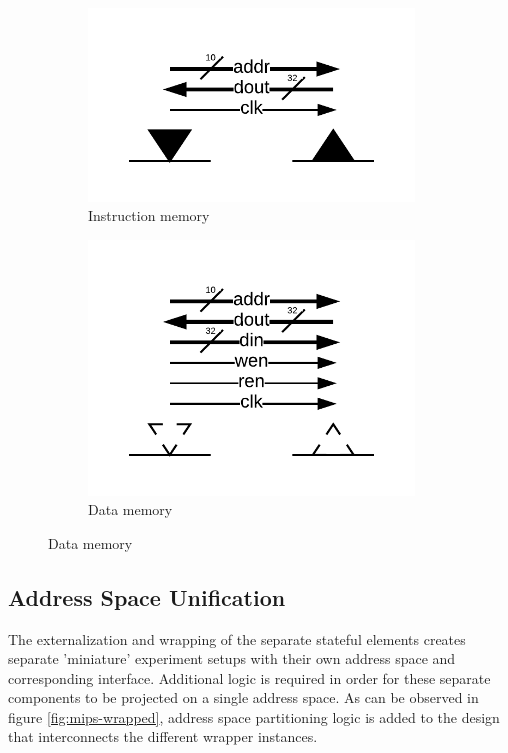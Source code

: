 \documentclass{article}
\begin{document}
\begin{figure}
\begin{subfigure}[b]{0.25\linewidth}
        \centering\captionsetup{width=0.95\linewidth}%
        \includegraphics[width=0.95\textwidth,trim=70px 70px 70px 70px, clip=true]{img/interface-rom}%
        \caption{Instruction memory}
    \end{subfigure}%
    \begin{subfigure}[b]{0.25\linewidth}
        \centering\captionsetup{width=0.95\linewidth}%
        \includegraphics[width=0.95\textwidth,trim=70px 70px 70px 70px, clip=true]{img/interface-ram}%
        \caption{Data memory}
    \end{subfigure}%

\end{figure}

\subsection{Address Space Unification}
The externalization and wrapping of the separate stateful elements creates separate 'miniature' experiment setups with their own address space and corresponding interface. Additional logic is required in order for these separate components to be projected on a single address space. As can be observed in figure \ref{fig:mips-wrapped}, address space partitioning logic is added to the design that interconnects the different wrapper instances. 
\end{document}
